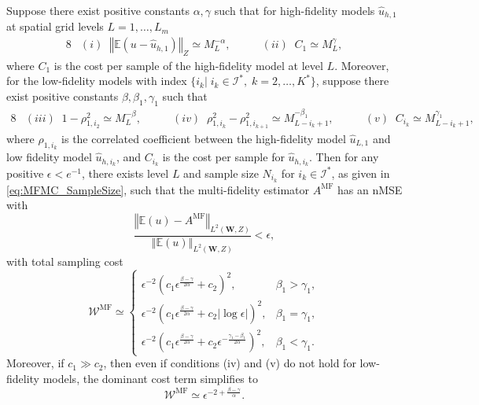 %
\begin{theorem}
\label{thm:Sample_cost_est}
 Suppose there exist positive constants $\alpha, \gamma$ such that for high-fidelity models $\widehat u_{h,1}$ at spatial grid levels $L=1,\ldots,L_m$
%
\begin{alignat*}{8}
    &(i)\;\; \left\Vert\mathbb{E}\left(u-\widehat u_{h,1}\right)\right\Vert_Z\simeq M_{L}^{-\alpha},\qquad
    &(ii)\;\; C_1 \simeq M_{L}^{\gamma},
\end{alignat*}
%
where $C_1$ is the cost per sample of the high-fidelity model at level $L$. Moreover, for the low-fidelity models with index $\{i_k | \; i_k\in \mathcal{I}^*,\;k=2, \ldots, K^*\}$, suppose there exist positive constants $\beta, \beta_1, \gamma_1$ such that 
%
\begin{alignat*}{8}
    &(iii)\;\; 1-\rho_{1,i_2}^2 \simeq M_{L}^{-\beta},
    \qquad
    &(iv)\;\; \rho_{1,i_k}^2-\rho_{1,i_{k+1}}^2 \simeq M_{L-i_k+1}^{-\beta_1},
    \qquad
&(v)\;\; C_{i_k} \simeq M_{L-i_k+1}^{\gamma_1},
\end{alignat*}
%
where $\rho_{1,i_k}$ is the correlated coefficient between the high-fidelity model $\widehat u_{L,1}$ and low fidelity model $\widehat u_{h,i_k}$, and $C_{i_k}$ is the cost per sample for $\widehat u_{h,i_k}$. Then for any positive $\epsilon<e^{-1}$, there exists level $L$ and sample size $N_{i_k}$ for $ i_k\in \mathcal{I}^*$, as given in \eqref{eq:MFMC_SampleSize}, such that the multi-fidelity estimator $A^{\text{MF}}$ has an nMSE with
\[
\frac{\left\Vert\mathbb{E}(u)-A^{\text{MF}} \right\Vert_{L^2(\boldsymbol W,Z)}}{\left\Vert\mathbb{E}(u) \right\Vert_{L^2( \boldsymbol W,Z)}}<\epsilon,
\]
with total sampling cost
%
\begin{equation*}
    \mathcal{W}^{\text{MF}} \simeq \left\{\begin{array}{ll}
\epsilon^{-2}\left(c_1\epsilon^{\frac{\beta-\gamma}{2\alpha}}+c_2\right)^2, & \beta_1>\gamma_1,\\
\epsilon^{-2}\left(c_1\epsilon^{\frac{\beta-\gamma}{2\alpha}}+c_2|\log\epsilon|\right)^2, & \beta_1=\gamma_1,\\
\epsilon^{-2}\left(c_1\epsilon^{\frac{\beta-\gamma}{2\alpha}}+c_2\epsilon^{-\frac{\gamma_1-\beta_1}{2\alpha}}\right)^2, & \beta_1<\gamma_1.
\end{array}
\right.
\end{equation*}
%
Moreover, if $c_1\gg c_2$, then even if conditions (iv) and (v) do not hold for low-fidelity models, the dominant cost term simplifies to 
\[
\mathcal{W}^\text{MF} \simeq \epsilon^{-2+\frac{\beta-\gamma}{\alpha}}.
\]
\end{theorem}
%


